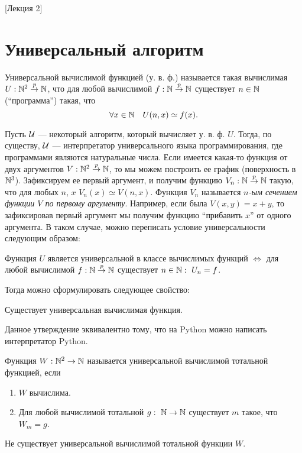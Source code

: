 [Лекция 2]
\newpage

\section{Универсальный алгоритм}

\begin{definition}
    Универсальной вычислимой функцией (у. в. ф.) называется такая вычислимая $U: \mathbb{N}^{2} \overset{p}{\to} \mathbb{N}$, что для любой вычислимой $f: \mathbb{N} \overset{p}{\to} \mathbb{N}$ существует $n \in \mathbb{N}$ (\enquote{программа}) такая, что
    $$
        \forall x \in \mathbb{N} \quad U(n, x) \simeq f(x).
    $$
\end{definition}
Пусть $\mathcal{U}$ --- некоторый алгоритм, который вычисляет у. в. ф. $U$.
Тогда, по существу, $\mathcal{U}$ --- интерпретатор универсального языка программирования, где программами являются натуральные числа.
Если имеется какая-то функция от двух аргументов $V: \mathbb{N}^{2} \overset{p}{\to} \mathbb{N}$, то мы можем построить ее график (поверхность в $\mathbb{N}^{3}$).
Зафиксируем ее первый аргумент, и получим функцию $V_{n}: \mathbb{N} \overset{p}{\to} \mathbb{N}$ такую, что для любых $n$, $x$ $V_{n}\left(x\right) \simeq V\left(n, x\right)$.
Функция $V_{n}$ называется {\it $n$-ым сечением функции $V$ по первому аргументу}.
Например, если была $V(x, y) = x + y$, то зафиксировав первый аргумент мы получим функцию \enquote{прибавить $x$} от одного аргумента.
В таком случае, можно переписать условие универсальности следующим образом:
\begin{statement}
    Функция $U$ является универсальной в классе вычислимых функций $\iff$ для любой вычислимой $f: \mathbb{N} \overset{p}{\to} \mathbb{N}$ существует $n \in \mathbb{N}:~U_{n} = f$.
\end{statement}
Тогда можно сформулировать следующее свойство:
\begin{property}[алгоритмов]
    Существует универсальная вычислимая функция.
\end{property}
Данное утверждение эквивалентно тому, что на Python можно написать интерпретатор Python.
\begin{definition}
    Функция $W: \mathbb{N}^{2} \to \mathbb{N}$ называется универсальной вычислимой тотальной функцией, если
    \begin{enumerate}
        \item $W$ вычислима.
        \item Для любой вычислимой тотальной $g:~\mathbb{N} \to \mathbb{N}$ существует $m$ такое, что $W_{m} = g$.
    \end{enumerate}
\end{definition}
\begin{statement}
    Не существует универсальной вычислимой тотальной функции $W$.
\end{statement}
